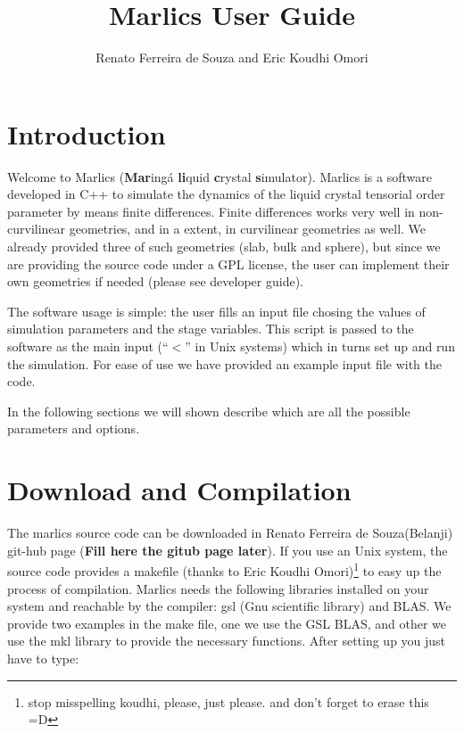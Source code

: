 \documentclass{article}
\title{Marlics User Guide}
\author{Renato Ferreira de Souza and
Eric Koudhi Omori}
\begin{document}
\maketitle

\section{Introduction}
  
Welcome to Marlics (\textbf{Mar}ingá \textbf{li}quid \textbf{c}rystal
\textbf{s}imulator). Marlics is a software developed in C++ to
simulate the dynamics of the liquid crystal tensorial order parameter
by means finite differences. Finite differences works very well in
non-curvilinear geometries, and in a extent, in curvilinear
geometries as well. We already provided three of such geometries
(slab, bulk and sphere), but since we are providing the source code
under a GPL license, the user can implement their own geometries if
needed (please see developer guide). 

The software usage is simple: the user fills an input file chosing the
values of simulation parameters and the stage variables. This script
is passed to the software as the main input (``$<$'' in Unix systems)
which in turns set up and run the simulation. For ease of use we have
provided an example input file with the code.  

{In the following sections we will shown describe which are all the possible 
parameters and options.
}

\section{Download and Compilation}

The marlics source code can be downloaded in Renato Ferreira de Souza(Belanji) git-hub page (\textbf{Fill here the gitub page later}). If you use an Unix system, the source code provides a makefile (thanks to Eric Koudhi Omori)\footnote{stop misspelling koudhi, please, just please. and don't forget to erase this =D} to easy up the process of compilation.
Marlics needs the following libraries installed on your system and reachable by the compiler: gsl (Gnu scientific library) and BLAS. We provide two examples in the make file, one we use the GSL BLAS, and other we use the mkl library to provide the necessary functions.
After setting up you just have to type:
\end{document}
